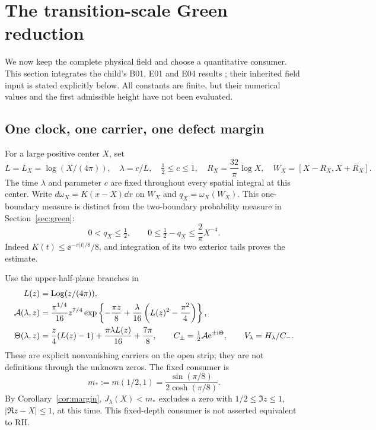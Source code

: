 \section{The transition-scale Green reduction}\label{sec:transition}

We now keep the complete physical field and choose a quantitative
consumer. This section integrates the child's B01, E01 and E04 results
\cite{GNPRSOuter,GNPRSLogTransfer}; their inherited field input is stated
explicitly below. All constants are finite, but their numerical values
and the first admissible height have not been evaluated.

\subsection{One clock, one carrier, one defect margin}
For a large positive center \(X\), set
\begin{equation}\label{eq:transition-band}
 L=L_X=\log(X/(4\pi)),\quad \lambda=c/L,\quad
 \tfrac12\le c\le1,\quad R_X=\frac{32}{\pi}\log X,
 \quad W_X=[X-R_X,X+R_X].
\end{equation}
The time \(\lambda\) and parameter \(c\) are fixed throughout every
spatial integral at this center. Write \(d\omega_X=K(x-X)\dd x\) on
\(W_X\) and \(q_X=\omega_X(W_X)\). This one-boundary measure is distinct
from the two-boundary probability measure in Section~\ref{sec:green}:
\begin{equation}\label{eq:window-mass}
 0<q_X\le\tfrac12,\qquad
 0\le\tfrac12-q_X\le\frac2\pi X^{-4}.
\end{equation}
Indeed \(K(t)\le\ee^{-\pi|t|/8}/8\), and integration of its two
exterior tails proves the estimate.

Use the upper-half-plane branches in
\begin{align}\label{eq:transition-carrier}
 L(z)&=\operatorname{Log}(z/(4\pi)),\nonumber\\
 \mathcal A(\lambda,z)&=\frac{\pi^{1/4}}{16}z^{7/4}
 \exp\left\{-\frac{\pi z}{8}
       +\frac{\lambda}{16}\left(L(z)^2-\frac{\pi^2}{4}\right)\right\},\nonumber\\
 \Theta(\lambda,z)&=\frac z4(L(z)-1)
                  +\frac{\pi\lambda L(z)}{16}+\frac{7\pi}{8},\qquad
 C_\pm=\tfrac12\mathcal A\mathrm e^{\pm\mathrm i\Theta},\qquad
 V_\lambda=H_\lambda/C_-.
\end{align}
These are explicit nonvanishing carriers on the open strip; they are
not definitions through the unknown zeros. The fixed consumer is
\begin{equation}\label{eq:transition-margin}
 m_*:=m(1/2,1)=\frac{\sin(\pi/8)}{2\cosh(\pi/8)}.
\end{equation}
By Corollary~\ref{cor:margin}, \(J_\lambda(X)<m_*\) excludes a zero
with \(1/2\le\Im z\le1\), \(|\Re z-X|\le1\), at this time.
This fixed-depth consumer is not asserted equivalent to RH.

